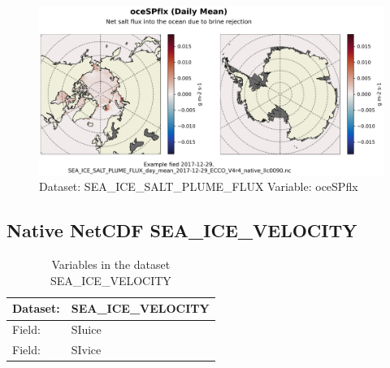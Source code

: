 \begin{figure}[H]
\centering
\includegraphics[width=\textwidth]{../images/plots/native_plots/Sea-Ice_Salt_Plume_Fluxes/oceSPflx.png}
\caption{Dataset: SEA\_ICE\_SALT\_PLUME\_FLUX Variable: oceSPflx}
\label{tab:table-SEA_ICE_SALT_PLUME_FLUX_oceSPflx-Plot}
\end{figure}
\pagebreak
\subsection{Native NetCDF SEA\_ICE\_VELOCITY}
\newp
\begin{longtable}{|p{}|p{}|}
\caption{Variables in the dataset SEA\_ICE\_VELOCITY}
\label{tab:table-SEA_ICE_VELOCITY-fields} \\ 
\hline \endhead \hline \endfoot
\rowcolor{lightgray} \textbf{Dataset:} & \textbf{SEA\_ICE\_VELOCITY} \\ \hline
Field: &SIuice \\ \hline
Field: &SIvice \\ \hline
\end{longtable}

\pagebreak
